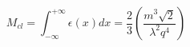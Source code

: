 \begin{equation}
\label{MK}
M_{cl} = \int_{-\infty}^{+\infty}\epsilon(x)dx
=\frac 23\left(\frac{m^3\sqrt{2}}{\lambda^2q^4}\right)
\end{equation}

